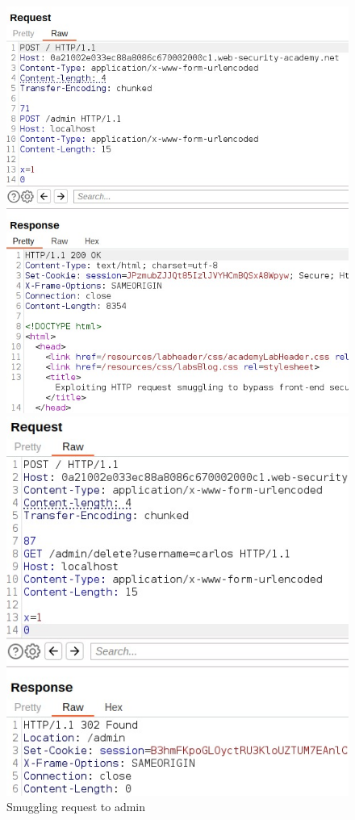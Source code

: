 \documentclass[conference]{IEEEtran}
\begin{document}
\begin{figure}[htbp]
	\begin{minipage}[t]{0.45\linewidth}
	  \centering
	  \includegraphics[width=\linewidth]{results/Bypass_frontend_req1_OK_response.jpeg}
	  \caption*{Smuggling request to admin}
	  \label{fig:bypass_req1}
	\end{minipage}
	\hfill
	\begin{minipage}[t]{0.45\linewidth}
	  \centering
	  \includegraphics[width=\linewidth]{results/Bypass_frontend_req2_deleting_carlos_successful.jpeg}

\end{minipage}
\end{figure}
\end{document}
